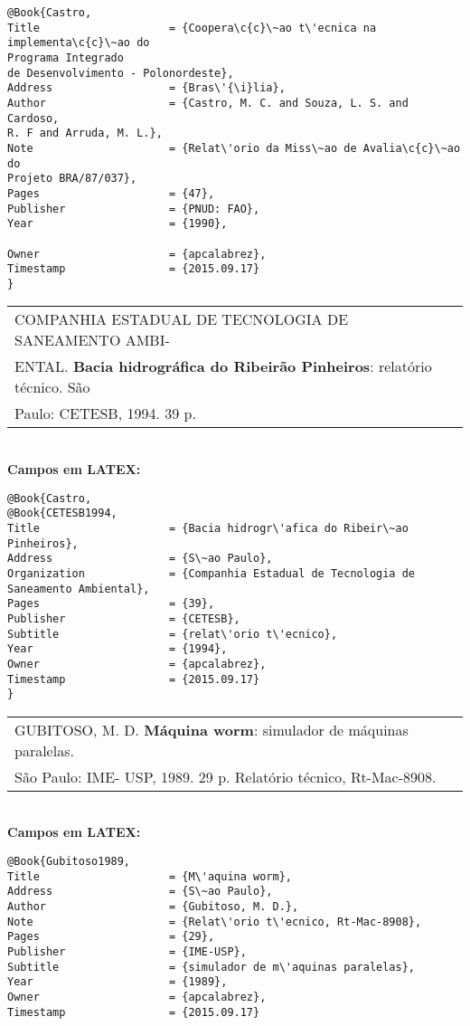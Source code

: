\begin{verbatim}
@Book{Castro,
Title                    = {Coopera\c{c}\~ao t\'ecnica na implementa\c{c}\~ao do 
Programa Integrado 
de Desenvolvimento - Polonordeste},
Address                  = {Bras\'{\i}lia},
Author                   = {Castro, M. C. and Souza, L. S. and Cardoso, 
R. F and Arruda, M. L.},
Note                     = {Relat\'orio da Miss\~ao de Avalia\c{c}\~ao do 
Projeto BRA/87/037},
Pages                    = {47},
Publisher                = {PNUD: FAO},
Year                     = {1990},

Owner                    = {apcalabrez},
Timestamp                = {2015.09.17}
}
\end{verbatim}

\begin{tabular}{|l|c|} \hline
	COMPANHIA ESTADUAL DE TECNOLOGIA DE SANEAMENTO AMBI-\\ENTAL. \textbf{Bacia hidrogr\'afica do Ribeir\~ao Pinheiros}: relat\'orio t\'ecnico. S\~ao \\Paulo: CETESB, 1994. 39 p.   \\\hline
\end{tabular}\\

\textbf{Campos em LATEX:}

\begin{verbatim}
@Book{Castro,
@Book{CETESB1994,
Title                    = {Bacia hidrogr\'afica do Ribeir\~ao Pinheiros},
Address                  = {S\~ao Paulo},
Organization             = {Companhia Estadual de Tecnologia de 
Saneamento Ambiental},
Pages                    = {39},
Publisher                = {CETESB},
Subtitle                 = {relat\'orio t\'ecnico},
Year                     = {1994},
Owner                    = {apcalabrez},
Timestamp                = {2015.09.17}
}
\end{verbatim}

\begin{tabular}{|l|c|} \hline
	GUBITOSO, M. D. \textbf{M\'aquina worm}: simulador de m\'aquinas paralelas. \\S\~ao Paulo: IME- USP, 1989. 29 p. Relat\'orio t\'ecnico, Rt-Mac-8908.   \\\hline
\end{tabular}\\

\textbf{Campos em LATEX:}

\begin{verbatim}
@Book{Gubitoso1989,
Title                    = {M\'aquina worm},
Address                  = {S\~ao Paulo},
Author                   = {Gubitoso, M. D.},
Note                     = {Relat\'orio t\'ecnico, Rt-Mac-8908},
Pages                    = {29},
Publisher                = {IME-USP},
Subtitle                 = {simulador de m\'aquinas paralelas},
Year                     = {1989},
Owner                    = {apcalabrez},
Timestamp                = {2015.09.17}
\end{verbatim}


